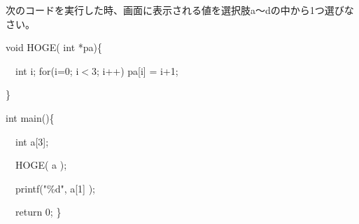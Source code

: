 次のコードを実行した時、画面に表示される値を選択肢a〜dの中から1つ選びなさい。\par
\noindent void HOGE( int *pa)\{ \par
\noindent 　int i; for(i=0; i$<$3; i++) pa[i] = i+1; \par
\noindent \} \par
\noindent int main()\{ \par
\noindent 　int a[3]; \par
\noindent 　HOGE( a ); \par
\noindent 　printf("\%d", a[1] ); \par
\noindent 　return 0; \} \par
